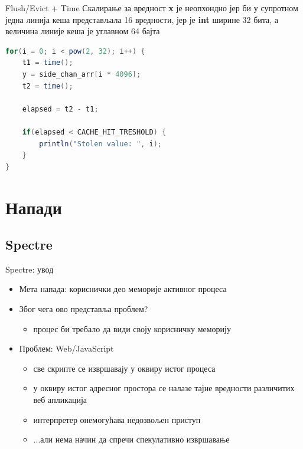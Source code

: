 \documentclass[xcolor=table]{beamer}
\begin{document}
\begin{frame}{Flush/Evict + Time}
        Скалирање за вредност \textbf{x} је неопхондно јер би у супротном једна линија кеша представљала 16 вредности, јер је \textbf{int} ширине 32 бита,
        а величина линије кеша је углавном 64 бајта
        
        \framebreak
        
        \begin{lstlisting}[language=java,frame=single]
for(i = 0; i < pow(2, 32); i++) {
    t1 = time();
    y = side_chan_arr[i * 4096];
    t2 = time();
    
    elapsed = t2 - t1;
    
    if(elapsed < CACHE_HIT_TRESHOLD) {
        println("Stolen value: ", i);
    }
}
        \end{lstlisting}
    \end{frame}
    
    \section{Напади}
    \subsection{Spectre}
    
    \begin{frame}{Spectre: увод}
        \begin{itemize}
            \item Мета напада: кориснички део меморије активног процеса
            \item Због чега ово представља проблем?
            \begin{itemize}
                \item процес би требало да види своју корисничку меморију
            \end{itemize}
            \item Проблем: Web/JavaScript
            \begin{itemize}
                \item све скрипте се извршавају у оквиру истог процеса
                \item у оквиру истог адресног простора се налазе тајне вредности различитих веб апликација
                \item интерпретер онемогућава недозвољен приступ
                \item ...али нема начин да спречи спекулативно извршавање
            \end{itemize}
        \end{itemize}
    \end{frame}
        
\end{document}

